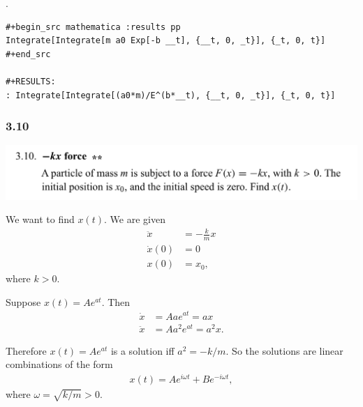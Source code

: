 .

\begin{verbatim}
#+begin_src mathematica :results pp
Integrate[Integrate[m a0 Exp[-b __t], {__t, 0, _t}], {_t, 0, t}]
#+end_src

#+RESULTS:
: Integrate[Integrate[(a0*m)/E^(b*__t), {__t, 0, _t}], {_t, 0, t}]

\end{verbatim}



\subsubsection*{3.10}
\begin{mdframed}
  \includegraphics[width=400pt]{img/physics--classical-mechanics--morin--3-10.png}
\end{mdframed}

We want to find $x(t)$. We are given
\begin{align*}
  \ddot{x}  &= -\frac{k}{m}x \\
  \dot{x}(0) &= 0 \\
  x(0)       &= x_0,
\end{align*}
where $k > 0$.

Suppose $x(t) = Ae^{at}$. Then
\begin{align*}
  \dot{x}  &= Aae^{at} = ax \\
  \ddot{x} &= Aa^2e^{at} = a^2x.
\end{align*}

Therefore $x(t) = Ae^{at}$ is a solution iff $a^2 = -k/m$. So the solutions are linear combinations
of the form
\begin{align*}
  x(t) = Ae^{i\omega t} + Be^{-i\omega t},
\end{align*}
where $\omega = \sqrt{k/m} > 0$.


